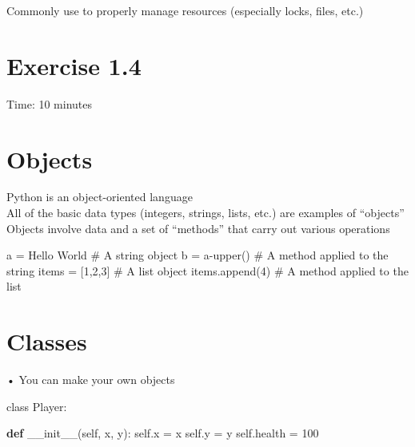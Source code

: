 \documentclass[
  letterpaper,
  DIV=11,
  numbers=noendperiod]{scrreprt}
\newenvironment{Shaded}{\begin{snugshade}}{\end{snugshade}}
\newcommand{\CommentTok}[1]{\textcolor[rgb]{0.37,0.37,0.37}{#1}}
\newcommand{\DecValTok}[1]{\textcolor[rgb]{0.68,0.00,0.00}{#1}}
\newcommand{\FunctionTok}[1]{\textcolor[rgb]{0.28,0.35,0.67}{#1}}
\newcommand{\KeywordTok}[1]{\textcolor[rgb]{0.00,0.23,0.31}{\textbf{#1}}}
\newcommand{\NormalTok}[1]{\textcolor[rgb]{0.00,0.23,0.31}{#1}}
\newcommand{\OperatorTok}[1]{\textcolor[rgb]{0.37,0.37,0.37}{#1}}
\newcommand{\StringTok}[1]{\textcolor[rgb]{0.13,0.47,0.30}{#1}}
\newcommand{\VariableTok}[1]{\textcolor[rgb]{0.07,0.07,0.07}{#1}}
\begin{document}
Commonly use to properly manage resources (especially locks, files,
etc.)


\chapter{Exercise 1.4}\label{exercise-1.4}

Time: 10 minutes


\chapter{Objects}\label{objects}

Python is an object-oriented language\\
All of the basic data types (integers, strings, lists, etc.) are
examples of ``objects''\\
Objects involve data and a set of ``methods'' that carry out various
operations

\begin{Shaded}
\begin{Highlighting}[]
\NormalTok{a }\OperatorTok{=} \StringTok{\textquotesingle{}Hello World\textquotesingle{}} \CommentTok{\# A string object  }
\NormalTok{b }\OperatorTok{=}\NormalTok{ a}\OperatorTok{{-}}\NormalTok{upper() }\CommentTok{\# A method applied to the string  }
\NormalTok{items }\OperatorTok{=}\NormalTok{ [}\DecValTok{1}\NormalTok{,}\DecValTok{2}\NormalTok{,}\DecValTok{3}\NormalTok{] }\CommentTok{\# A list object  }
\NormalTok{items.append(}\DecValTok{4}\NormalTok{) }\CommentTok{\# A method applied to the list }
\end{Highlighting}
\end{Shaded}


\chapter{Classes}\label{classes}

• You can make your own objects

class Player:

\begin{Shaded}
\begin{Highlighting}[]
\KeywordTok{def} \FunctionTok{\_\_init\_\_}\NormalTok{(}\VariableTok{self}\NormalTok{, x, y):}
    \VariableTok{self}\NormalTok{.x }\OperatorTok{=}\NormalTok{ x}
    \VariableTok{self}\NormalTok{.y }\OperatorTok{=}\NormalTok{ y}
    \VariableTok{self}\NormalTok{.health }\OperatorTok{=} \DecValTok{100} 
\end{Highlighting}
\end{Shaded}
\end{document}
